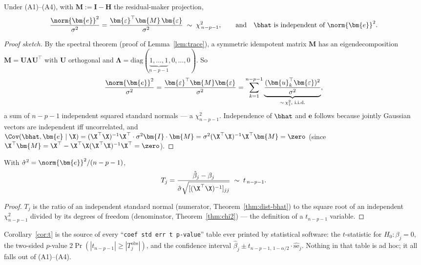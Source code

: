 \begin{theorem}\label{thm:chi2}
Under (A1)--(A4), with $\bm{M} := \bm{I} - \bm{H}$ the residual-maker projection,
\[
  \frac{\norm{\bm{e}}^2}{\sigma^2} = \frac{\bm{\varepsilon}^\top \bm{M} \, \bm{\varepsilon}}{\sigma^2} \;\sim\; \chi^2_{\,n-p-1},
  \qquad\text{and}\quad \bhat \text{ is independent of } \norm{\bm{e}}^2.
\]
\end{theorem}
\begin{proof}[Proof sketch]
By the spectral theorem (proof of Lemma~\ref{lem:trace}), a symmetric idempotent matrix $\bm{M}$ has an eigendecomposition $\bm{M} = \bm{U} \bm{\Lambda} \bm{U}^\top$ with $\bm{U}$ orthogonal and $\bm{\Lambda} = \mathrm{diag}(\underbrace{1,\dots,1}_{n-p-1}, 0, \dots, 0)$. So
\[
  \frac{\norm{\bm{e}}^2}{\sigma^2} = \frac{\bm{\varepsilon}^\top \bm{M} \bm{\varepsilon}}{\sigma^2}
  = \sum_{k=1}^{n-p-1} \underbrace{\frac{(\bm{u}_k^\top \bm{\varepsilon})^2}{\sigma^2}}_{\sim\, \chi^2_1 \text{, i.i.d.}},
\]
a sum of $n-p-1$ independent squared standard normals — a $\chi^2_{n-p-1}$. Independence of $\bhat$ and $\bm{e}$ follows because jointly Gaussian vectors are independent iff uncorrelated, and $\Cov(\bhat, \bm{e} \mid \X) = (\X^\top\X)^{-1}\X^\top \cdot \sigma^2\bm{I} \cdot \bm{M} = \sigma^2 (\X^\top\X)^{-1} \X^\top \bm{M} = \zero$ (since $\X^\top \bm{M} = \X^\top - \X^\top\X(\X^\top\X)^{-1}\X^\top = \zero$).
\end{proof}

\begin{corollary}\label{cor:t}
With $\hat{\sigma}^2 = \norm{\bm{e}}^2 / (n-p-1)$,
\[
  T_j = \frac{\hat{\beta}_j - \beta_j}{\hat{\sigma}\sqrt{[(\X^\top\X)^{-1}]_{jj}}} \;\sim\; t_{\,n-p-1}.
\]
\end{corollary}
\begin{proof}
$T_j$ is the ratio of an independent standard normal (numerator, Theorem~\ref{thm:dist-bhat}) to the square root of an independent $\chi^2_{n-p-1}$ divided by its degrees of freedom (denominator, Theorem~\ref{thm:chi2}) — the definition of a $t_{n-p-1}$ variable.
\end{proof}

Corollary~\ref{cor:t} is the source of every ``\texttt{coef std err t p-value}'' table ever printed by statistical software: the $t$-statistic for $H_0: \beta_j = 0$, the two-sided $p$-value $2\Pr(|t_{n-p-1}| \geq |T_j^{\mathrm{obs}}|)$, and the confidence interval $\hat{\beta}_j \pm t_{n-p-1,\,1-\alpha/2} \cdot \widehat{\mathrm{se}}_j$. Nothing in that table is ad hoc; it all falls out of (A1)--(A4).

